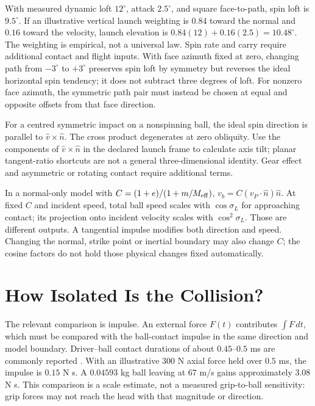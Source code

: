 With measured dynamic loft $12^\circ$, attack $2.5^\circ$, and square
face-to-path, spin loft is $9.5^\circ$. If an illustrative vertical launch
weighting is $0.84$ toward the normal and $0.16$ toward the velocity,
launch elevation is $0.84(12)+0.16(2.5)=10.48^\circ$.
The weighting is empirical, not a universal law. Spin rate and carry require
additional contact and flight inputs. With face azimuth fixed at zero, changing
path from $-3^\circ$ to $+3^\circ$ preserves spin loft by symmetry but reverses
the ideal horizontal spin tendency; it does not subtract three degrees of loft.
For nonzero face azimuth, the symmetric path pair must instead be chosen at
equal and opposite offsets from that face direction.

For a centred symmetric impact on a nonspinning ball, the ideal spin direction
is parallel to $\hat v\times\hat n$. The cross product degenerates at zero
obliquity. Use the components of $\hat v\times\hat n$ in the declared launch
frame to calculate axis tilt; planar tangent-ratio shortcuts are not a general
three-dimensional identity.
Gear effect
and asymmetric or rotating contact require additional terms.

In a normal-only model with $C=(1+e)/(1+m/M_{\rm eff})$,
$v_b=C(v_P\cdot\hat n)\hat n$. At fixed $C$ and incident speed, total ball
speed scales with $\cos\sigma_L$ for approaching contact;
its projection onto incident velocity scales with $\cos^2\sigma_L$. Those are
different outputs. A tangential impulse modifies both direction and speed.
Changing the normal, strike point or inertial boundary may also change $C$;
the cosine factors do not hold those physical changes fixed automatically.

\section{How Isolated Is the Collision?}

The relevant comparison is impulse. An external force $F(t)$ contributes
$\int F\,dt$, which must be compared with the ball-contact impulse in the
same direction and model boundary. Driver--ball contact durations of about
$0.45$--$0.5$ ms are commonly reported \citep{Cochran1968,Penner2003}. With an
illustrative $300$ N axial force held over $0.5$ ms, the impulse is $0.15$ N s.
A $0.04593$ kg ball
leaving at $67$ m/s gains approximately $3.08$ N s. This comparison is a
scale estimate, not a measured grip-to-ball sensitivity: grip forces may not
reach the head with that magnitude or direction.

